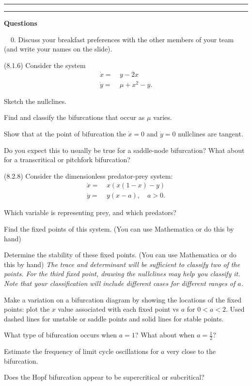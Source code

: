 \documentclass[12pt,letterpaper,noanswers]{exam}
\begin{document}
\vspace{0.2cm}

\hrule
\vspace{0.2cm}


\vspace{0.2cm}

\hrule
\vspace{0.2cm}
\noindent\textbf{Questions}

\noindent \ \ 0.  Discuss your breakfast preferences with the other members of your team (and write your names on the slide).

\begin{questions}
\question (8.1.6) Consider the system
\begin{align*}
\dot{x} = &\ y - 2x \\
\dot{y} = &\ \mu+x^2-y.
\end{align*}
\begin{parts}
\item Sketch the nullclines.
\item Find and classify the bifurcations that occur as $\mu$ varies.
\item Show that at the point of bifurcation the $\dot{x}=0$ and $\dot{y}=0$ nullclines are tangent.  
\item Do you expect this to usually be true for a saddle-node bifurcation?  What about for a transcritical or pitchfork bifurcation?
\end{parts}

\question (8.2.8) Consider the dimensionless predator-prey system:
\begin{align*}
\dot{x} = &\ x(x(1-x)-y) \\
\dot{y} = &\ y(x-a), \quad a>0.
\end{align*}
\begin{parts}
\item Which variable is representing prey, and which predators?
\item Find the fixed points of this system. (You can use Mathematica or do this by hand)
\item Determine the stability of these fixed points.  (You can use Mathematica or do this by hand)  \emph{The trace and determinant will be sufficient to classify two of the points.  For the third fixed point, drawing the nullclines may help you classify it.  Note that your classification will include different cases for different ranges of $a$.}
\item Make a variation on a bifurcation diagram by showing the locations of the fixed points: plot the $x$ value associated with each fixed point vs $a$ for $0 < a < 2$.  Used dashed lines for unstable or saddle points and solid lines for stable points.
\item What type of bifurcation occurs when $a=1$?  What about when $a = \frac{1}{2}$?
\item Estimate the frequency of limit cycle oscillations for $a$ very close to the bifurcation.
\item Does the Hopf bifurcation appear to be supercritical or subcritical?  


\end{parts}
\end{questions}
\end{document}
